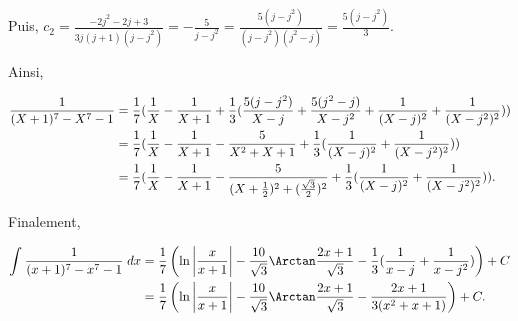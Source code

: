 {{\begin{enumerate}
Puis, $c_2=\frac{-2j^2-2j+3}{3j(j+1)(j-j^2)}=-\frac{5}{j-j^2}=\frac{5(j-j^2)}{(j-j^2)(j^2-j)}=\frac{5(j-j^2)}{3}$.

Ainsi,

\begin{align*}\ensuremath
\frac{1}{(X+1)^7-X^7-1}&=\frac{1}{7}
(\frac{1}{X}-\frac{1}{X+1}+\frac{1}{3}(\frac{5(j-j^2)}{X-j}+\frac{5(j^2-j)}{X-j^2}+\frac{1}{(X-j)^2}+\frac{1}{(X-j^2)^2}))\\
 &=\frac{1}{7}
(\frac{1}{X}-\frac{1}{X+1}-\frac{5}{X^2+X+1}+\frac{1}{3}(\frac{1}{(X-j)^2}+\frac{1}{(X-j^2)^2}))\\
 &=\frac{1}{7}
(\frac{1}{X}-\frac{1}{X+1}-\frac{5}{(X+\frac{1}{2})^2+(\frac{\sqrt{3}}{2})^2}+\frac{1}{3}(\frac{1}{(X-j)^2}+\frac{1}{(X-j^2)^2})).
\end{align*}

Finalement,

\begin{align*}\ensuremath
\int_{}^{}\frac{1}{(x+1)^7-x^7-1}\;dx&=\frac{1}{7}\left(\ln\left|\frac{x}{x+1}\right|-\frac{10}{\sqrt{3}}
\Arctan\frac{2x+1}{\sqrt{3}}-\frac{1}{3}(\frac{1}{x-j}+\frac{1}{x-j^2})\right)+C\\
 &=\frac{1}{7}\left(\ln\left|\frac{x}{x+1}\right|-\frac{10}{\sqrt{3}}
\Arctan\frac{2x+1}{\sqrt{3}}-\frac{2x+1}{3(x^2+x+1)}\right)+C.
\end{align*}

\end{enumerate}}
}